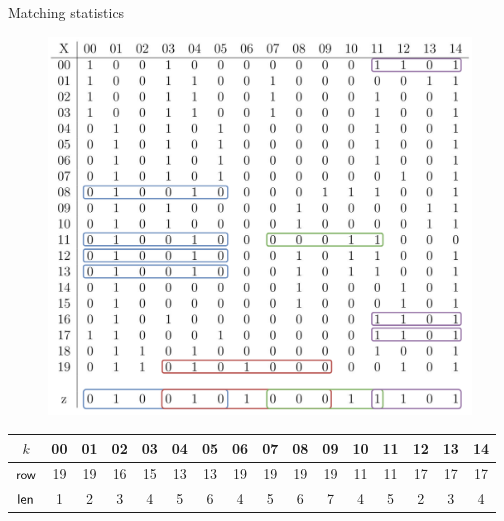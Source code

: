 \documentclass[]{beamer}
\def\len{\mbox{\rm {\sf len}}}
\def\row{\mbox{\rm {\sf row}}}
\begin{document}
\begin{frame}{Matching statistics}
  \vspace{-0.35cm}
 \begin{figure}[H]
    \centering
    \includegraphics[scale = 0.205]{img/pbwtmatch.pdf}
  \end{figure}
  \vspace{-0.5cm}
  \begin{table}[H]
    \scriptsize
    \centering
    \begin{tabular}{c|ccccccccccccccc}
      $k$ & 00 & 01 & 02 & 03 & 04 &  {\color{nordcyan}05} & 06 & 07 & 08
      &  {\color{nordred}09} & 10 &  {\color{nordgreen}11} & 12 & 13
      &  {\color{nordpurple}14} \\
      \hline
      $\row$ & 19 & 19 & 16 & 15 & 13 &  {\color{nordcyan}13} & 19 & 19 & 19
      &  {\color{nordred}19} & 11 &  {\color{nordgreen}11} & 17 & 17
      &  {\color{nordpurple}17} \\
      $\len$ & 1 & 2 & 3 & 4 & 5 & {\color{nordcyan}6} & 4 & 5 & 6
      & {\color{nordred}7} & 4 & {\color{nordgreen}5} & 2 & 3
      & {\color{nordpurple}4}\\
    \end{tabular}
  \end{table}
\end{frame}
\end{document}
